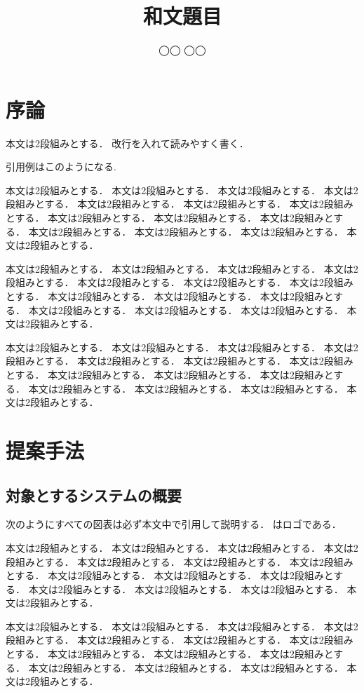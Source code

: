 \documentclass{/workdir/classes/summary}
\title{和文題目}
\author{◯◯ ◯◯}
\begin{document}
\maketitle

\thispagestyle{mypagestyle}
\pagestyle{mypagestyle}

\section{序論}
本文は2段組みとする．
改行を入れて読みやすく書く．

引用例はこのようになる\cite{Schlick1994,Chikushi2020,kingma2017Adam,tang2021cause}.

本文は2段組みとする．
本文は2段組みとする．
本文は2段組みとする．
本文は2段組みとする．
本文は2段組みとする．
本文は2段組みとする．
本文は2段組みとする．
本文は2段組みとする．
本文は2段組みとする．
本文は2段組みとする．
本文は2段組みとする．
本文は2段組みとする．
本文は2段組みとする．
本文は2段組みとする．

本文は2段組みとする．
本文は2段組みとする．
本文は2段組みとする．
本文は2段組みとする．
本文は2段組みとする．
本文は2段組みとする．
本文は2段組みとする．
本文は2段組みとする．
本文は2段組みとする．
本文は2段組みとする．
本文は2段組みとする．
本文は2段組みとする．
本文は2段組みとする．
本文は2段組みとする．

本文は2段組みとする．
本文は2段組みとする．
本文は2段組みとする．
本文は2段組みとする．
本文は2段組みとする．
本文は2段組みとする．
本文は2段組みとする．
本文は2段組みとする．
本文は2段組みとする．
本文は2段組みとする．
本文は2段組みとする．
本文は2段組みとする．
本文は2段組みとする．
本文は2段組みとする．

\section{提案手法}
\subsection{対象とするシステムの概要}
次のようにすべての図表は必ず本文中で引用して説明する．
はロゴである．

本文は2段組みとする．
本文は2段組みとする．
本文は2段組みとする．
本文は2段組みとする．
本文は2段組みとする．
本文は2段組みとする．
本文は2段組みとする．
本文は2段組みとする．
本文は2段組みとする．
本文は2段組みとする．
本文は2段組みとする．
本文は2段組みとする．
本文は2段組みとする．
本文は2段組みとする．

本文は2段組みとする．
本文は2段組みとする．
本文は2段組みとする．
本文は2段組みとする．
本文は2段組みとする．
本文は2段組みとする．
本文は2段組みとする．
本文は2段組みとする．
本文は2段組みとする．
本文は2段組みとする．
本文は2段組みとする．
本文は2段組みとする．
本文は2段組みとする．
本文は2段組みとする．
\end{document}
